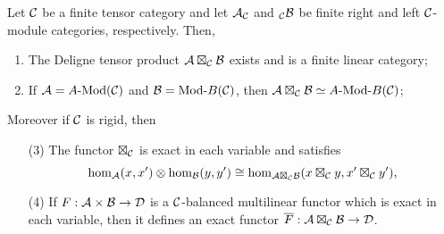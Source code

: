 \documentclass{amsart}
\begin{document}
\begin{theorem}
	Let $\mathcal C$ be a finite tensor category and let $\mathcal A_{\mathcal C}$ and ${}_{\mathcal C}\mathcal B$ be finite right and left $\mathcal C$-module categories, respectively. Then,
	\begin{enumerate}
		\item The Deligne tensor product $\mathcal A \boxtimes_{\mathcal C} \mathcal B$ exists and is a finite linear category;
		\item If $\cA = \Mod{A}{}(\cC)$ and $\cB = \Mod{}{B}(\cC)$, then $\cA \boxtimes_{\cC} \cB \simeq \Mod{A }{B}(\cC)$;
	\end{enumerate} 
Moreover if $\mathcal C$ is rigid, then 	
	\begin{enumerate}
		\item[(3)] The functor $\boxtimes_{\mathcal C}$ is exact in each variable and satisfies 
		\begin{equation*}
			\hom_{\mathcal A}(x,x') \otimes \hom_{\mathcal B}(y, y') \cong \hom_{\mathcal A \boxtimes_{\mathcal C} \mathcal B} (x \boxtimes_{\mathcal C} y, x' \boxtimes_{\mathcal C} y'),
		\end{equation*}
		\item[(4)] If $F: \mathcal A \times \mathcal B \to \mathcal D$ is a $\mathcal C$-balanced multilinear functor which is exact in each variable, then it defines an exact functor $\overline{F}: \mathcal A \boxtimes_{\mathcal C} \mathcal B \to \mathcal D$. 
	\end{enumerate} 
\end{theorem}
\end{document}
